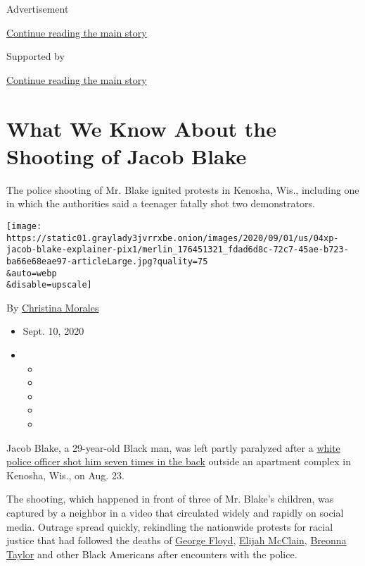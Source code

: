 Advertisement

\protect\hyperlink{after-top}{Continue reading the main story}

Supported by

\protect\hyperlink{after-sponsor}{Continue reading the main story}

\hypertarget{what-we-know-about-the-shooting-of-jacob-blake}{%
\section{What We Know About the Shooting of Jacob
Blake}\label{what-we-know-about-the-shooting-of-jacob-blake}}

The police shooting of Mr. Blake ignited protests in Kenosha, Wis.,
including one in which the authorities said a teenager fatally shot two
demonstrators.

\texttt{[image: https://static01.graylady3jvrrxbe.onion/images/2020/09/01/us/04xp-jacob-blake-explainer-pix1/merlin\_176451321\_fdad6d8c-72c7-45ae-b723-ba66e68eae97-articleLarge.jpg?quality=75\\\&auto=webp\\\&disable=upscale]}

By
\href{https://www.nytimes3xbfgragh.onion/by/christina-morales}{Christina
Morales}

\begin{itemize}
\item
  Sept. 10, 2020
\item
  \begin{itemize}
  \item
  \item
  \item
  \item
  \item
  \end{itemize}
\end{itemize}

Jacob Blake, a 29-year-old Black man, was left partly paralyzed after a
\href{https://www.nytimes3xbfgragh.onion/2020/08/23/us/kenosha-police-shooting.html}{white
police officer shot him seven times in the back} outside an apartment
complex in Kenosha, Wis., on Aug. 23.

The shooting, which happened in front of three of Mr. Blake's children,
was captured by a neighbor in a video that circulated widely and rapidly
on social media. Outrage spread quickly, rekindling the nationwide
protests for racial justice that had followed the deaths of
\href{https://www.nytimes3xbfgragh.onion/2020/05/27/us/george-floyd-minneapolis-death.html}{George
Floyd},
\href{https://www.nytimes3xbfgragh.onion/article/who-was-elijah-mcclain.html}{Elijah
McClain},
\href{https://www.nytimes3xbfgragh.onion/article/breonna-taylor-police.html}{Breonna
Taylor} and other Black Americans after encounters with the police.

